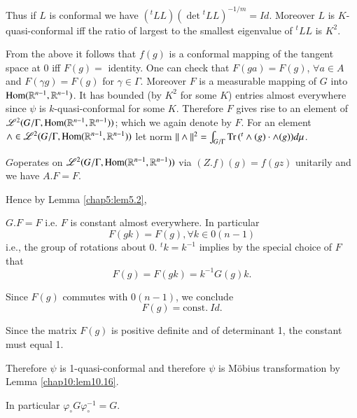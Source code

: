 Thus if $L$ is conformal we have $({}^t LL) (\det {}^tLL)^{-1/m}=
Id$. Moreover $L$ is $K$-quasi-conformal iff the ratio of largest to
the smallest eigenvalue of ${}^tLL$ is $K^2$.

From the above it follows that $f(g)$ is a conformal mapping of the
tangent space at 0 iff $F(g)=$ identity. One can check that $F(ga)=
F(g)$, $\forall a \in A$ and $F(\gamma g)= F(g)$ for $\gamma \in
\Gamma$. Moreover $F$ is a measurable mapping of $G$ into $\operatorname{Hom}
(\mathbb{R}^{n-1}, \mathbb{R}^{n-1})$. It has bounded (by $K^2$ for
some $K$) entries almost everywhere since $\psi$ is
$k$-quasi-conformal for some $K$. Therefore $F$ gives rise to an
element of $\mathscr{L}^2 (G/\Gamma, \operatorname{Hom} (\mathbb{R}^{n-1},
\mathbb{R}^{n-1}))$; which we again denote by $F$. For an element
$\wedge \in \mathscr{L}^2 (G/\Gamma, \Hom (\mathbb{R}^{n-1},\break
\mathbb{R}^{n-1}))$ let norm $|| \wedge||^2 = \int_{G/\Gamma} \operatorname{Tr\,}
({}^t \wedge (g)\cdot \wedge (g)) d \mu$.

$G$\pageoriginale operates on $\mathscr{L}^2 (G/\Gamma, \operatorname{Hom} (\mathbb{R}^{n-1},
\mathbb{R}^{n-1}))$ via $(Z. f)(g)=f(gz)$ unitarily and we have $A.F
=F$.

Hence by Lemma \ref{chap5:lem5.2},  

$G.F=F$ i.e. $F$ is constant almost everywhere. In particular 
$$
F(gk)=F(g), \forall k \in 0 (n-1)
$$
i.e., the group of rotations about 0. ${}^t k= k^{-1}$ implies by the
special choice of $F$ that
$$
F(g)= F(gk)= k^{-1} G(g)k.
$$

Since $F(g)$ commutes with $0 (n-1)$, we conclude
$$
F(g) = \text{const.}~ Id.
$$

Since the matrix $F(g)$ is positive definite and of determinant 1, the
constant must equal 1.

Therefore $\psi$ is 1-quasi-conformal and therefore $\psi$ is M\"obius
transformation by Lemma \ref{chap10:lem10.16}.

In particular \quad $\varphi_\circ G \varphi_\circ^{-1}= G$.

